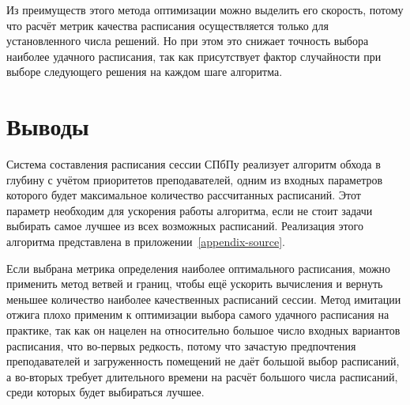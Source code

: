 Из преимуществ этого метода оптимизации можно выделить его скорость, потому что расчёт метрик качества расписания осуществляется только для установленного числа решений. Но при этом это снижает точность выбора наиболее удачного расписания, так как присутствует фактор случайности при выборе следующего решения на каждом шаге алгоритма.
\FloatBarrier
\section{Выводы} \label{ch2:conclusion}

Система составления расписания сессии СПбПу реализует алгоритм обхода в глубину с учётом приоритетов преподавателей, одним из входных параметров которого будет максимальное количество рассчитанных расписаний. Этот параметр необходим для ускорения работы алгоритма, если не стоит задачи выбирать самое лучшее из всех возможных расписаний. Реализация этого алгоритма представлена в приложении~\ref{appendix-source}.

Если выбрана метрика определения наиболее оптимального расписания, можно применить метод ветвей и границ, чтобы ещё ускорить вычисления и вернуть меньшее количество наиболее качественных расписаний сессии. Метод имитации отжига плохо применим к оптимизации выбора самого удачного расписания на практике, так как он нацелен на относительно большое число входных вариантов расписания, что во-первых редкость, потому что зачастую предпочтения преподавателей и загруженность помещений не даёт большой выбор расписаний, а во-вторых требует длительного времени на расчёт большого числа расписаний, среди которых будет выбираться лучшее.